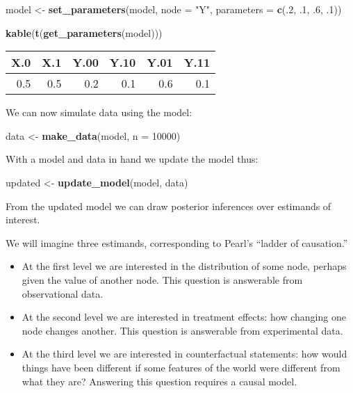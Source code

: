 \documentclass[
  12pt,
]{book}
\newenvironment{Shaded}{\begin{snugshade}}{\end{snugshade}}
\newcommand{\AttributeTok}[1]{\textcolor[rgb]{0.13,0.29,0.53}{#1}}
\newcommand{\DecValTok}[1]{\textcolor[rgb]{0.00,0.00,0.81}{#1}}
\newcommand{\FunctionTok}[1]{\textcolor[rgb]{0.13,0.29,0.53}{\textbf{#1}}}
\newcommand{\NormalTok}[1]{#1}
\newcommand{\OtherTok}[1]{\textcolor[rgb]{0.56,0.35,0.01}{#1}}
\newcommand{\StringTok}[1]{\textcolor[rgb]{0.31,0.60,0.02}{#1}}
\begin{document}
\begin{Shaded}
\begin{Highlighting}[]
\NormalTok{model }\OtherTok{\textless{}{-}} 
  \FunctionTok{set\_parameters}\NormalTok{(model, }\AttributeTok{node =} \StringTok{"Y"}\NormalTok{, }\AttributeTok{parameters =} \FunctionTok{c}\NormalTok{(.}\DecValTok{2}\NormalTok{, .}\DecValTok{1}\NormalTok{, .}\DecValTok{6}\NormalTok{, .}\DecValTok{1}\NormalTok{))}

\FunctionTok{kable}\NormalTok{(}\FunctionTok{t}\NormalTok{(}\FunctionTok{get\_parameters}\NormalTok{(model)))}
\end{Highlighting}
\end{Shaded}

\begin{tabular}{r|r|r|r|r|r}
\hline
X.0 & X.1 & Y.00 & Y.10 & Y.01 & Y.11\\
\hline
0.5 & 0.5 & 0.2 & 0.1 & 0.6 & 0.1\\
\hline
\end{tabular}

We can now simulate data using the model:

\begin{Shaded}
\begin{Highlighting}[]
\NormalTok{data }\OtherTok{\textless{}{-}} \FunctionTok{make\_data}\NormalTok{(model, }\AttributeTok{n =} \DecValTok{10000}\NormalTok{)}
\end{Highlighting}
\end{Shaded}

With a model and data in hand we update the model thus:

\begin{Shaded}
\begin{Highlighting}[]
\NormalTok{updated }\OtherTok{\textless{}{-}} \FunctionTok{update\_model}\NormalTok{(model, data)}
\end{Highlighting}
\end{Shaded}

From the updated model we can draw posterior inferences over estimands of interest.

We will imagine three estimands, corresponding to Pearl's ``ladder of causation.''

\begin{itemize}
\item
  At the first level we are interested in the distribution of some node, perhaps given the value of another node. This question is answerable from observational data.
\item
  At the second level we are interested in treatment effects: how changing one node changes another. This question is answerable from experimental data.
\item
  At the third level we are interested in counterfactual statements: how would things have been different if some features of the world were different from what they are? Answering this question requires a causal model.
\end{itemize}
\end{document}
